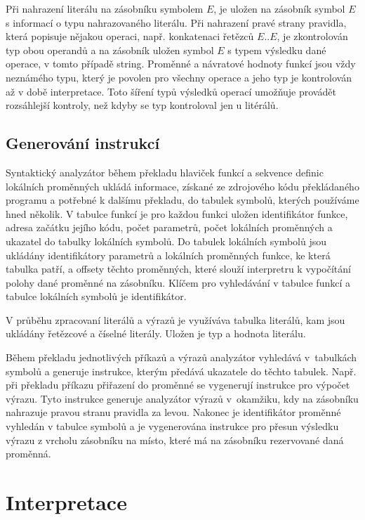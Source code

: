 \documentclass[a4paper,11pt,titlepage]{article}
\begin{document}
Při nahrazení literálu na zásobníku symbolem $E$, je uložen na zásobník symbol $E$ s informací o typu nahrazovaného literálu.
Při nahrazení pravé strany pravidla, která popisuje nějakou operaci, např. konkatenaci řetězců $E .. E$, je zkontrolován typ obou operandů a na zásobník uložen symbol $E$ s typem výsledku dané operace, v tomto případě string. Proměnné a návratové hodnoty funkcí jsou vždy neznámého typu, který je povolen pro všechny operace a jeho typ je kontrolován až v době interpretace. Toto šíření typů výsledků operací umožňuje provádět rozsáhlejší kontroly, než kdyby se typ kontroloval jen u litérálů.

\subsection{Generování instrukcí}

Syntaktický analyzátor během překladu hlaviček funkcí a sekvence definic lo\-kál\-ních proměnných ukládá informace, získané ze zdrojového kódu pře\-klá\-da\-ného programu a potřebné k dalšímu překladu, do tabulek symbolů, kterých používáme hned několik. V tabulce funkcí je pro každou funkci uložen identifikátor funkce, adresa začátku jejího kódu, počet parametrů, počet lokálních pro\-měn\-ných a ukazatel do tabulky lokálních symbolů. Do tabulek lokálních symbolů jsou ukládány identifikátory parametrů a lokálních proměnných funkce, ke která tabulka patří, a offsety těchto proměnných, které slouží interpretru k vypočítání polohy dané proměnné na zásobníku. Klíčem pro vyhledávání v tabulce funkcí a tabulce lokálních symbolů je identifikátor.

V průběhu zpracovaní literálů a výrazů je využíváva tabulka literálů, kam jsou ukládány řetězcové a číselné  literály. Uložen je typ a hodnota literálu.

Během překladu jednotlivých příkazů a výrazů analyzátor vyhledává v~tabulkách symbolů a generuje instrukce, kterým předává ukazatele do těchto tabulek. Např. při překladu příkazu přiřazení do proměnné se vygenerují instrukce pro výpočet výrazu. Tyto instrukce generuje analyzátor výrazů v~okamžiku, kdy na zásobníku nahrazuje pravou stranu pravidla za levou. Nakonec je identifikátor proměnné vyhledán v tabulce symbolů a je vygenerována instrukce pro přesun výsledku výrazu z vrcholu zásobníku na místo, které má na zásobníku rezervované daná proměnná.

\section{Interpretace}
\end{document}
